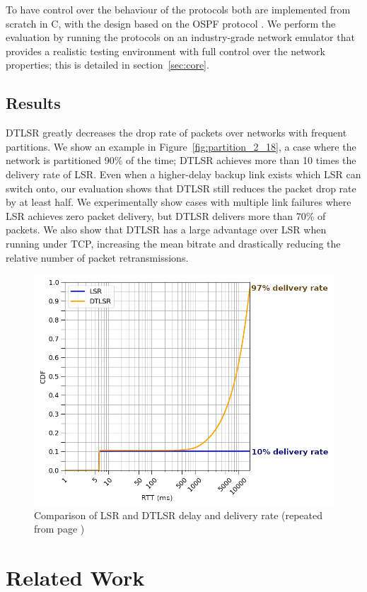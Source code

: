 \documentclass[withindex,glossary,openany]{cam-thesis}
\newcommand{\repeatcaption}[2]{%
  \renewcommand{\thefigure}{\ref{#1}}%
  \captionsetup{list=no}%
  \caption{#2 (repeated from page \pageref{#1})}%
  \addtocounter{figure}{-1}%
}
\begin{document}
To have control over the behaviour of the protocols both are implemented from scratch in C, with the design based on the OSPF protocol \cite{OSPF}. We perform the evaluation by running the protocols on an industry-grade network emulator \cite{CORE} that provides a realistic testing environment with full control over the network properties; this is detailed in section~\ref{sec:core}.

\subsection{Results}

DTLSR greatly decreases the drop rate of packets over networks with frequent partitions. We show an example in Figure~\ref{fig:partition_2_18}, a case where the network is partitioned 90\% of the time; DTLSR achieves more than 10 times the delivery rate of LSR. Even when a higher-delay backup link exists which LSR can switch onto, our evaluation shows that DTLSR still reduces the packet drop rate by at least half. We experimentally show cases with multiple link failures where LSR achieves zero packet delivery, but DTLSR delivers more than 70\% of packets. We also show that DTLSR has a large advantage over LSR when running under TCP, increasing the mean bitrate and drastically reducing the relative number of packet retransmissions.

\begin{figure}[h]
  \centering
  \hspace*{2.4cm}
  \includegraphics[width=0.8\linewidth]{delay_partition_flap2_18}
  \repeatcaption{fig:partition_2_18}{Comparison of LSR and DTLSR delay and delivery rate}
\end{figure}

\section{Related Work}
\end{document}
